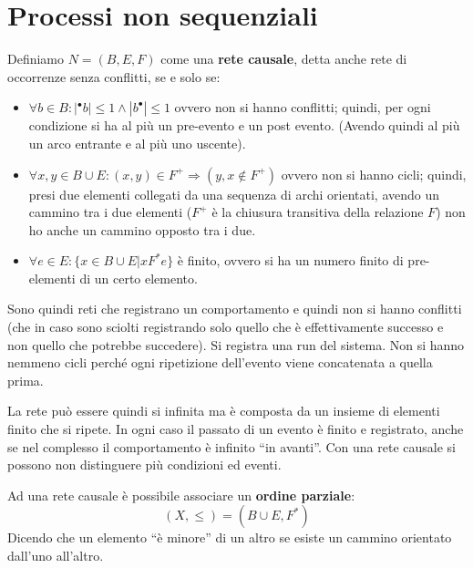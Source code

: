 \section{Processi non sequenziali}
\begin{definizione}
    Definiamo $N = (B,E, F)$ come una \textbf{rete causale}, detta anche rete di occorrenze senza conflitti, se e solo se:
    \begin{itemize}
        \item $\forall b \in B: |^{\bullet}b| \leq 1 \land |b^{\bullet}| \leq 1$ ovvero non si hanno conflitti; quindi, per ogni condizione si ha al più un pre-evento e un post evento. (Avendo quindi al più un arco entrante e al più uno uscente).
        \item $\forall x, y \in B \cup E: (x, y) \in F^{+} \Rightarrow (y, x \notin F^{+})$ ovvero non si hanno cicli; quindi, presi due elementi collegati da una sequenza di archi orientati, avendo un cammino tra i due elementi ($F^{+}$ è la chiusura transitiva della relazione $F$) non ho anche un cammino opposto tra i due.
        \item $\forall e \in E: \{x \in B \cup E | xF^{\ast}e\}$ è finito, ovvero si ha un numero finito di pre-elementi di un certo elemento.
    \end{itemize}
    Sono quindi reti che registrano un comportamento e quindi non si hanno conflitti (che in caso sono sciolti registrando solo quello che è effettivamente successo e non quello che potrebbe succedere). Si registra una run del sistema. Non si hanno nemmeno cicli perché ogni ripetizione dell'evento viene concatenata a quella prima.

    La rete può essere quindi si infinita ma è composta da un insieme di elementi finito che si ripete. In ogni caso il passato di un evento è finito e registrato, anche se nel complesso il comportamento è infinito “in avanti”. Con una rete causale si possono non distinguere più condizioni ed eventi.
\end{definizione}
Ad una rete causale è possibile associare un \textbf{ordine parziale}:
\begin{equation}
    (X, \leq) = (B \cup E, F^{\ast})
\end{equation}
Dicendo che un elemento “è minore” di un altro se esiste un cammino orientato dall'uno all'altro.
